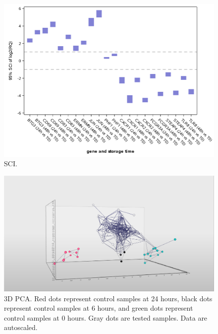 \documentclass[fleqn,10pt]{wlscirep}
\begin{document}
\begin{figure}[ht]
    \centering
    \includegraphics[width=\linewidth]{figure4}
    \caption{SCI.}
    \label{fig:figure4}
    \end{figure}

\begin{figure}[ht]
    \centering
    \includegraphics[width=\linewidth]{figure5}
    \caption{3D PCA. Red dots represent control samples at 24 hours, black dots represent control samples at 6 hours, and green dots represent control samples at 0 hours. Gray dots are tested samples. Data are autoscaled.}
    \label{fig:figure5}
    \end{figure}
\end{document}
